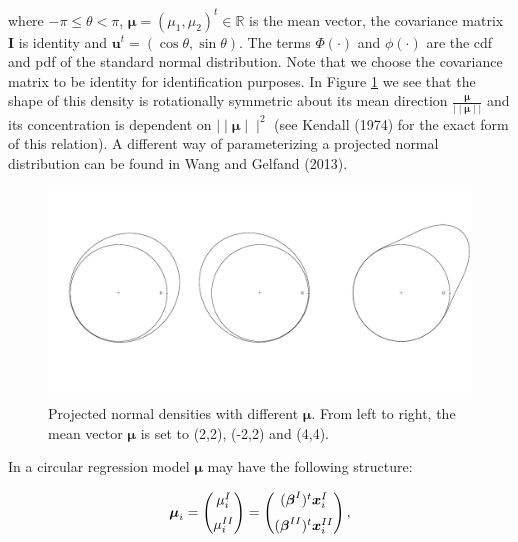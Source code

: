 \documentclass[11pt,]{article}
\begin{document}
where \(-\pi \leq \theta < \pi\),
\(\boldsymbol{\mu} = (\mu_1, \mu_2)^t \in \mathbb{R}\) is the mean
vector, the covariance matrix \(\boldsymbol{I}\) is identity and
\(\boldsymbol{u}^t = (\cos \theta, \sin \theta)\). The terms
\(\Phi(\cdot)\) and \(\phi(\cdot)\) are the cdf and pdf of the standard
normal distribution. Note that we choose the covariance matrix to be
identity for identification purposes. In Figure \ref{figPN} we see that
the shape of this density is rotationally symmetric about its mean
direction \(\frac{\boldsymbol{\mu}}{\mid\mid\boldsymbol{\mu}\mid\mid}\)
and its concentration is dependent on
\(\mid\mid \boldsymbol{\mu}\mid\mid^2\) (see Kendall (1974) for the
exact form of this relation). A different way of parameterizing a
projected normal distribution can be found in Wang and Gelfand (2013).

\begin{figure}
\centering
\includegraphics{Plots/PN.pdf}
\caption{Projected normal densities with different $\boldsymbol{\mu}$. From left to right, the mean vector $\boldsymbol{\mu}$ is set to (2,2), (-2,2) and (4,4).} 
\label{figPN}
\end{figure}

In a circular regression model \(\boldsymbol{\mu}\) may have the
following structure:

\begin{equation}\label{regression}
\boldsymbol{\mu}_{i} = \begin{pmatrix}
  \mu_{i}^{I}  \vspace{0.2cm}  \\
\mu_{i}^{II}
 \end{pmatrix}=\begin{pmatrix}
  (\boldsymbol{\beta}^{I})^{t}\boldsymbol{x}_{i}^{I} \vspace{0.2cm}  \\
  (\boldsymbol{\beta}^{II})^{t}\boldsymbol{x}_{i}^{II} 
 \end{pmatrix},
\end{equation}
\end{document}
